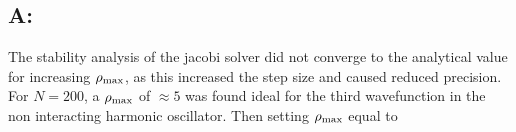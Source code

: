 \subsection{A:}
\label{sub:a_}

The stability analysis of the jacobi solver did not converge to the
analytical value for increasing $\rho_{\text{max}}$, as this increased the step size
and caused reduced precision. For $N=200$, a $\rho_{\text{max}}$ of $\approx 5$ was
found ideal for the third wavefunction in the non interacting harmonic
oscillator. Then setting $\rho_{\text{max}}$ equal to 





\begin{equation}
    
\end{equation}
